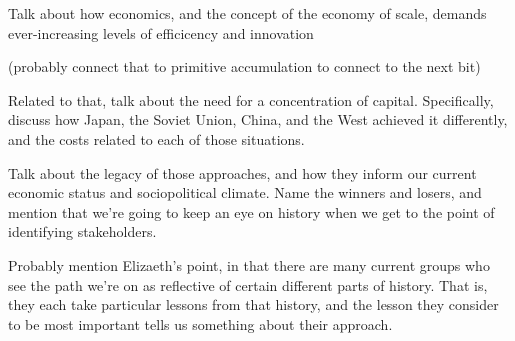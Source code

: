 Talk about how economics, and the concept of the economy of scale, 
demands ever-increasing levels of efficicency and innovation

(probably connect that to primitive accumulation to connect to the next bit)

Related to that, talk about the need for a concentration of capital.  
Specifically, discuss how Japan, the Soviet Union, China, and the 
West achieved it differently, and the costs related to each of those 
situations.

Talk about the legacy of those approaches, and how they inform our 
current economic status and sociopolitical climate.  Name the winners 
and losers, and mention that we're going to keep an eye on history when 
we get to the point of identifying stakeholders.  

Probably mention 
Elizaeth's point, in that there are many current groups who see the 
path we're on as reflective of certain different parts of history.  
That is, they each take particular lessons from that history, and 
the lesson they consider to be most important tells us something 
about their approach.




